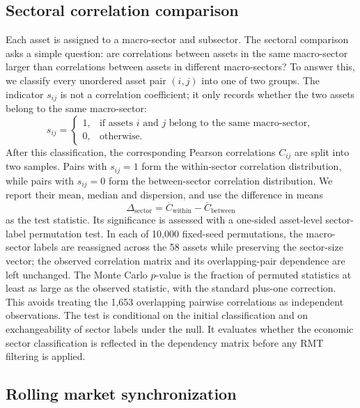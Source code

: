 \subsection{Sectoral correlation comparison}
\label{subsec:sectoral_method}

Each asset is assigned to a macro-sector and subsector. The sectoral comparison asks a simple question: are correlations between assets in the same macro-sector larger than correlations between assets in different macro-sectors? To answer this, we classify every unordered asset pair $(i,j)$ into one of two groups. The indicator $s_{ij}$ is not a correlation coefficient; it only records whether the two assets belong to the same macro-sector:
\begin{equation}
s_{ij}
=
\begin{cases}
1, & \text{if assets } i \text{ and } j \text{ belong to the same macro-sector},\\
0, & \text{otherwise.}
\end{cases}
\end{equation}
After this classification, the corresponding Pearson correlations $C_{ij}$ are split into two samples. Pairs with $s_{ij}=1$ form the within-sector correlation distribution, while pairs with $s_{ij}=0$ form the between-sector correlation distribution. We report their mean, median and dispersion, and use the difference in means
\begin{equation}
\Delta_{\mathrm{sector}}
=
\overline{C}_{\mathrm{within}}
-
\overline{C}_{\mathrm{between}}
\end{equation}
as the test statistic. Its significance is assessed with a one-sided asset-level sector-label permutation test. In each of 10,000 fixed-seed permutations, the macro-sector labels are reassigned across the 58 assets while preserving the sector-size vector; the observed correlation matrix and its overlapping-pair dependence are left unchanged. The Monte Carlo $p$-value is the fraction of permuted statistics at least as large as the observed statistic, with the standard plus-one correction. This avoids treating the 1,653 overlapping pairwise correlations as independent observations. The test is conditional on the initial classification and on exchangeability of sector labels under the null. It evaluates whether the economic sector classification is reflected in the dependency matrix before any RMT filtering is applied.

\subsection{Rolling market synchronization}
\label{subsec:rolling_corr_method}

